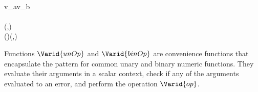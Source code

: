 \begin{hscode}
\>[28]{}\anonymous {}\<[43]%
\>[43]{}\mathrel{=}\;\<[E]%
\\[\blanklineskip]%
\>[4]{}\<[7]%
\>[7]{}\mathrel{=}\;\;v_a\;v_b{}\<[E]%
\\
\>[B]{}\<[4]%
\>[4]{}\<[E]%
\\
\>[4]{}\<[7]%
\>[7]{}(,){}\<[E]%
\\[\blanklineskip]%
\>[B]{}\;\;\;(\;\anonymous \;\anonymous )\mathrel{=}(\;,){}\<[E]%
\ColumnHook
\end{hscode}\resethooks

Functions \ensuremath{\Varid{unOp}} and \ensuremath{\Varid{binOp}} are convenience functions that encapsulate the
pattern for common unary and binary numeric functions. They evaluate their
arguments in a scalar context, check if any of the arguments evaluated to an
error, and perform the operation \ensuremath{\Varid{op}}.

